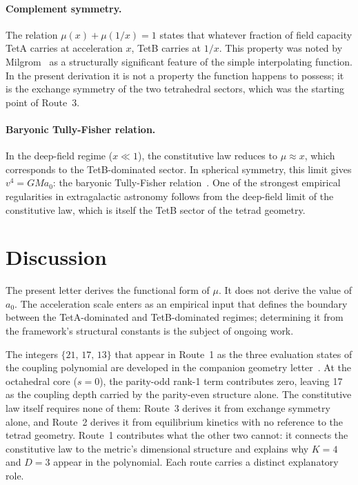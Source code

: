 \documentclass[twocolumn]{iopjournal}
\begin{document}
\paragraph{Complement symmetry.}
The relation $\mu(x) + \mu(1/x) = 1$ states that whatever
fraction of field capacity TetA carries at acceleration $x$,
TetB carries at $1/x$. This property was noted by
Milgrom~\cite{Milgrom1983} as a structurally significant
feature of the simple interpolating function. In the present
derivation it is not a property the function happens to
possess; it is the exchange symmetry of the two tetrahedral
sectors, which was the starting point of Route~3.

\paragraph{Baryonic Tully-Fisher relation.}
In the deep-field regime ($x \ll 1$), the constitutive law
reduces to $\mu \approx x$, which corresponds to the
TetB-dominated sector. In spherical symmetry, this limit gives
$v^4 = GMa_0$: the baryonic Tully-Fisher
relation~\cite{McGaugh2000}. One of the strongest empirical
regularities in extragalactic astronomy follows from the
deep-field limit of the constitutive law, which is itself
the TetB sector of the tetrad geometry.


\section{Discussion}

The present letter derives the functional form of $\mu$. It
does not derive the value of $a_0$. The acceleration scale
enters as an empirical input that defines the boundary between
the TetA-dominated and TetB-dominated regimes; determining it
from the framework's structural constants is the subject of
ongoing work.

The integers $\{21,\,17,\,13\}$ that appear in Route~1 as the
three evaluation states of the coupling polynomial are developed
in the companion geometry letter~\cite{Nelson2026a}. At the
octahedral core ($s = 0$), the parity-odd rank-1 term
contributes zero, leaving 17 as the coupling depth carried by
the parity-even structure alone. The
constitutive law itself requires none of them: Route~3
derives it from exchange symmetry alone, and Route~2 derives
it from equilibrium kinetics with no reference to the tetrad
geometry. Route~1 contributes what the other two cannot: it
connects the constitutive law to the metric's dimensional
structure and explains why $K = 4$ and $D = 3$ appear in the
polynomial. Each route carries a distinct explanatory role.
\end{document}
